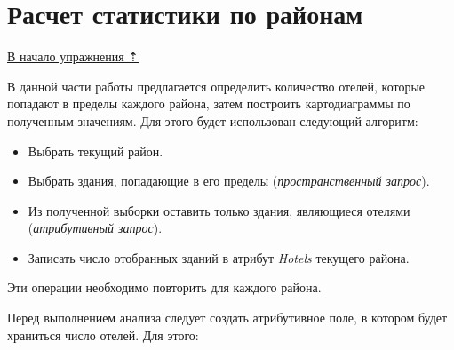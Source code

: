 \documentclass[12pt,]{book}
\begin{document}
\hypertarget{map-ref-economic-stats}{%
\section{Расчет статистики по районам}\label{map-ref-economic-stats}}

\protect\hyperlink{map-ref-economic}{В начало упражнения ⇡}

В данной части работы предлагается определить количество отелей, которые попадают в пределы каждого района, затем построить картодиаграммы по полученным значениям. Для этого будет использован следующий алгоритм:

\begin{itemize}
\item
  Выбрать текущий район.
\item
  Выбрать здания, попадающие в его пределы (\emph{пространственный запрос}).
\item
  Из полученной выборки оставить только здания, являющиеся отелями (\emph{атрибутивный запрос}).
\item
  Записать число отобранных зданий в атрибут \emph{Hotels} текущего района.
\end{itemize}

Эти операции необходимо повторить для каждого района.

Перед выполнением анализа следует создать атрибутивное поле, в котором будет храниться число отелей. Для этого:
\end{document}
